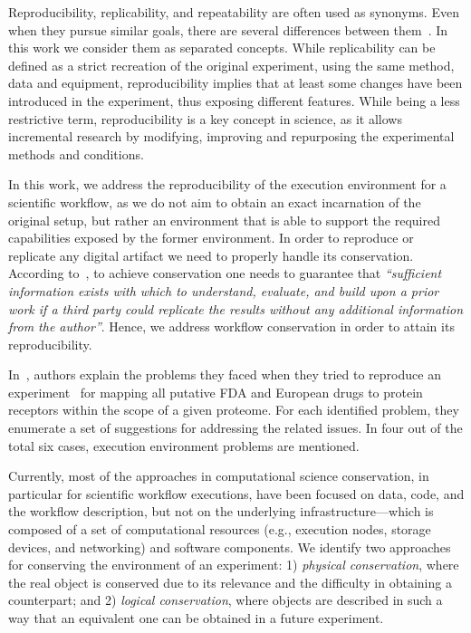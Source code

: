 
Reproducibility, replicability, and repeatability are often used as synonyms. Even when they
pursue similar goals, there are several differences between them~\cite{Drummond2011}. In this work we consider them
as separated concepts. While replicability can be defined as a
strict recreation of the original experiment, using the same method, data and equipment, reproducibility
implies that at least some changes have been introduced in the experiment, thus exposing 
different features.  While being a less restrictive term, reproducibility
is a key concept in science, as it allows incremental research 
by modifying, improving and repurposing the experimental methods and conditions. 

In this work, we address the reproducibility of the execution environment for a scientific workflow, 
as we do not aim to obtain an exact incarnation of the original setup, but rather an 
environment that is able to support the required capabilities exposed by the former 
environment. In order to reproduce or replicate any digital artifact we need to properly handle its conservation.
According to~\cite{King1995}, to achieve conservation one needs to guarantee that \emph{``sufficient information
exists with which to understand, evaluate, and build upon a prior work if a third party could replicate
 the results without any additional information from the author''}. Hence, we address workflow conservation
in order to attain its reproducibility.


In~\cite{Garijo2013}, authors explain the problems they faced when they tried to 
reproduce an experiment~\cite{drugomePrimer} for mapping all putative FDA 
and European drugs to protein receptors within the scope of a given proteome. For 
each identified problem, they enumerate a set of suggestions for addressing the related
issues. In four out of the total six cases, execution environment problems are mentioned.

Currently, most of the approaches in computational science conservation, in particular 
for scientific workflow executions, have been focused on data, code, and the workflow 
description, but not on the underlying infrastructure---which is composed of a set of 
computational resources (e.g., execution nodes, storage devices, and networking) and 
software components. We identify two approaches for conserving the environment of an 
experiment: 1) \emph{physical conservation}, where the real object is conserved due to 
its relevance and the difficulty in obtaining a counterpart; and 2) \emph{logical conservation}, 
where objects are described in such a way that an equivalent one can be obtained in a 
future experiment.

